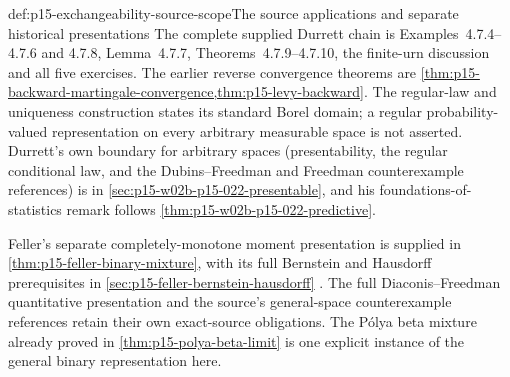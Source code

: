\begin{proofboundary}{def:p15-exchangeability-source-scope}{The source applications and separate historical presentations}
The complete supplied Durrett chain is Examples~4.7.4--4.7.6 and 4.7.8,
Lemma~4.7.7, Theorems~4.7.9--4.7.10, the finite-urn discussion
and all five exercises. The earlier reverse convergence theorems
are \cref{thm:p15-backward-martingale-convergence,thm:p15-levy-backward}.
The regular-law and uniqueness construction states its standard
Borel domain; a regular probability-valued representation on every
arbitrary measurable space is not asserted.
Durrett's own boundary for arbitrary spaces (presentability, the
regular conditional law, and the Dubins--Freedman and Freedman
counterexample references) is in \cref{sec:p15-w02b-p15-022-presentable},
and his foundations-of-statistics remark follows
\cref{thm:p15-w02b-p15-022-predictive}.

Feller's separate completely-monotone moment presentation is supplied in
\cref{thm:p15-feller-binary-mixture}, with its full Bernstein and
Hausdorff prerequisites in \cref{sec:p15-feller-bernstein-hausdorff}
\cite[vol.~II, VII.1--VII.4]{Feller1971ProbabilityII}.
The full Diaconis--Freedman quantitative presentation and the source's
general-space counterexample references retain their own exact-source
obligations. The P\'olya beta mixture already proved in
\cref{thm:p15-polya-beta-limit} is one explicit instance of the
general binary representation here.
\end{proofboundary}
